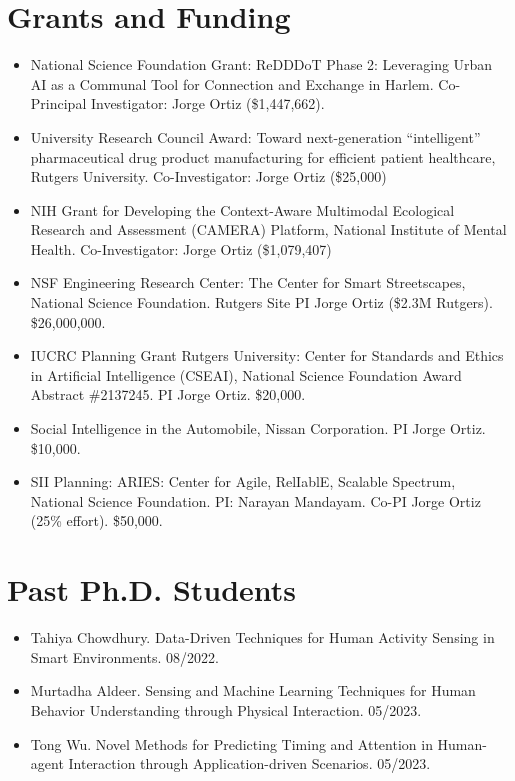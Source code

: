 \documentclass[12pt]{article}
\begin{document}
\section{Grants and Funding}
\begin{itemize}
    \item National Science Foundation Grant: ReDDDoT Phase 2: Leveraging Urban AI as a Communal Tool for Connection and Exchange in Harlem. Co-Principal Investigator: Jorge Ortiz (\$1,447,662).
    \item University Research Council Award: Toward next-generation ``intelligent'' pharmaceutical drug product manufacturing for efficient patient healthcare, Rutgers University. Co-Investigator: Jorge Ortiz (\$25,000)
    \item NIH Grant for Developing the Context-Aware Multimodal Ecological Research and Assessment (CAMERA) Platform, National Institute of Mental Health. Co-Investigator: Jorge Ortiz (\$1,079,407)
    \item NSF Engineering Research Center: The Center for Smart Streetscapes, National Science Foundation. Rutgers Site PI Jorge Ortiz (\$2.3M Rutgers). \$26,000,000.
    \item IUCRC Planning Grant Rutgers University: Center for Standards and Ethics in Artificial Intelligence (CSEAI), National Science Foundation Award Abstract \#2137245. PI Jorge Ortiz. \$20,000.
    \item Social Intelligence in the Automobile, Nissan Corporation. PI Jorge Ortiz. \$10,000.
    \item SII Planning: ARIES: Center for Agile, RelIablE, Scalable Spectrum, National Science Foundation. PI: Narayan Mandayam. Co-PI Jorge Ortiz (25\% effort). \$50,000.
\end{itemize}


\section{Past Ph.D. Students}
\begin{itemize}
    \item Tahiya Chowdhury. Data-Driven Techniques for Human Activity Sensing in Smart Environments. 08/2022.
    \item Murtadha Aldeer. Sensing and Machine Learning Techniques for Human Behavior Understanding through Physical Interaction. 05/2023.
    \item Tong Wu. Novel Methods for Predicting Timing and Attention in Human-agent Interaction through Application-driven Scenarios. 05/2023.
\end{itemize}
\end{document}
